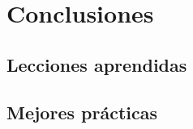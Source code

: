 \chapter{Conclusiones}
\label{chapter:conclusions}
\blindtext

\section{Lecciones aprendidas}
\label{section:lecciones-aprendidas}
\blindtext

\section{Mejores prácticas}
\label{section:mejores-practicas}
\blindtext
